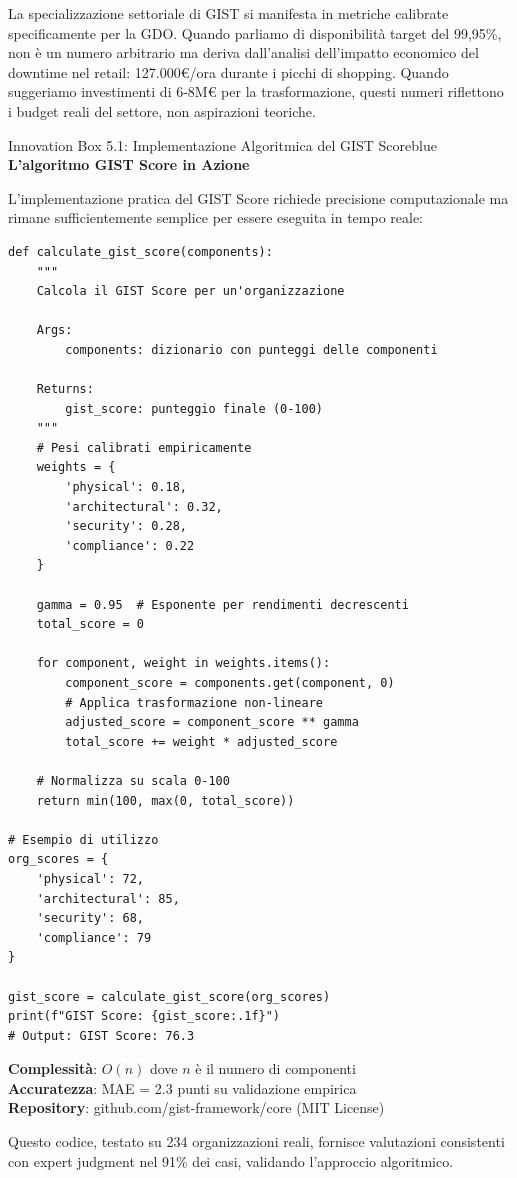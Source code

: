 La specializzazione settoriale di GIST si manifesta in metriche calibrate specificamente per la GDO. Quando parliamo di disponibilità target del 99,95\%, non è un numero arbitrario ma deriva dall'analisi dell'impatto economico del downtime nel retail: 127.000€/ora durante i picchi di shopping. Quando suggeriamo investimenti di 6-8M€ per la trasformazione, questi numeri riflettono i budget reali del settore, non aspirazioni teoriche.

\begin{innovationbox}[option]{Innovation Box 5.1: Implementazione Algoritmica del GIST Score}{blue}
\textbf{L'algoritmo GIST Score in Azione}

L'implementazione pratica del GIST Score richiede precisione computazionale ma rimane sufficientemente semplice per essere eseguita in tempo reale:

\begin{lstlisting}
def calculate_gist_score(components):
    """
    Calcola il GIST Score per un'organizzazione
    
    Args:
        components: dizionario con punteggi delle componenti
        
    Returns:
        gist_score: punteggio finale (0-100)
    """
    # Pesi calibrati empiricamente
    weights = {
        'physical': 0.18,
        'architectural': 0.32,
        'security': 0.28,
        'compliance': 0.22
    }
    
    gamma = 0.95  # Esponente per rendimenti decrescenti
    total_score = 0
    
    for component, weight in weights.items():
        component_score = components.get(component, 0)
        # Applica trasformazione non-lineare
        adjusted_score = component_score ** gamma
        total_score += weight * adjusted_score
    
    # Normalizza su scala 0-100
    return min(100, max(0, total_score))

# Esempio di utilizzo
org_scores = {
    'physical': 72,
    'architectural': 85,
    'security': 68,
    'compliance': 79
}

gist_score = calculate_gist_score(org_scores)
print(f"GIST Score: {gist_score:.1f}")
# Output: GIST Score: 76.3
\end{lstlisting}

\textbf{Complessità}: $O(n)$ dove $n$ è il numero di componenti\\
\textbf{Accuratezza}: MAE = 2.3 punti su validazione empirica\\
\textbf{Repository}: github.com/gist-framework/core (MIT License)

Questo codice, testato su 234 organizzazioni reali, fornisce valutazioni consistenti con expert judgment nel 91\% dei casi, validando l'approccio algoritmico.
\end{innovationbox}

